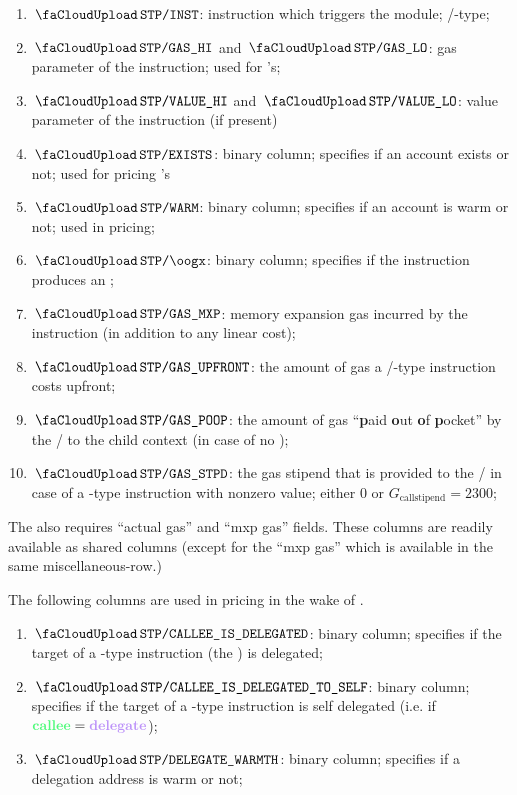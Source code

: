 \begin{enumerate}[resume]
	\item $\miscStpInst$:
		instruction which triggers the \stpMod{} module; /-type;
	\item $\miscStpGasHi$ and $\miscStpGasLo$:
		gas parameter of the instruction; used for 's;
	\item $\miscStpValueHi$ and $\miscStpValueLo$:
		value parameter of the instruction (if present)
	\item $\miscStpAccExists$:
		binary column;
		specifies if an account exists or not; used for pricing 's
	\item $\miscStpAccWarmth$:
		binary column;
		specifies if an account is warm or not;
		used in  pricing;
	\item $\miscStpOogx$:
		binary column;
		specifies if the instruction produces an \oogxSH{};
	\item $\miscStpGasMxp$:
		memory expansion gas incurred by the instruction (in addition to any linear cost);
	\item $\miscStpGasUpfront$:
		the amount of gas a /-type instruction costs upfront;
	\item $\miscStpGasPoop$:
		the amount of gas ``\textbf{p}aid \textbf{o}ut \textbf{o}f \textbf{p}ocket'' by the \creator{}/\callerName{} to the child context (in case of no \oogxSH{});
	\item $\miscStpGasStipend$:
		the gas stipend that is provided to the \calleeName{}/\createe{} in case of a -type instruction with nonzero value; either $0$ or $G_\text{callstipend} = 2300$;
\end{enumerate}
\saNote{} The \stpMod{} also requires ``actual gas'' and ``mxp gas'' fields.
These columns are readily available as shared columns (except for the ``mxp gas'' which is available in the same miscellaneous-row.)

The following columns are used in  pricing in the wake of \cite{EIP-7702}.
\begin{enumerate}[resume]
	\item $\miscStpCalleeIsDelegated$:
		binary column;
		specifies if the target of a -type instruction (the \calleeName{}) is delegated;
	\item $\miscStpCalleeIsSelfDelegated$:
		binary column;
		specifies if the target of a -type instruction is self delegated (i.e. if $\calleeName = \delegateName$);
	\item $\miscStpDelegateWarmth$:
		binary column;
		specifies if a delegation address is warm or not;
\end{enumerate}
